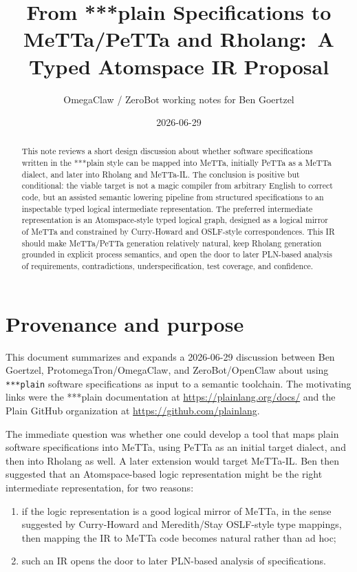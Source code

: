 \documentclass[11pt]{article}
\title{From ***plain Specifications to MeTTa/PeTTa and Rholang:\
A Typed Atomspace IR Proposal}
\author{OmegaClaw / ZeroBot working notes for Ben Goertzel}
\date{2026-06-29}
\begin{document}
\maketitle

\begin{abstract}
This note reviews a short design discussion about whether software
specifications written in the ***plain style can be mapped into MeTTa, initially
PeTTa as a MeTTa dialect, and later into Rholang and MeTTa-IL.  The conclusion
is positive but conditional: the viable target is not a magic compiler from
arbitrary English to correct code, but an assisted semantic lowering pipeline
from structured specifications to an inspectable typed logical intermediate
representation.  The preferred intermediate representation is an
Atomspace-style typed logical graph, designed as a logical mirror of MeTTa and
constrained by Curry-Howard and OSLF-style correspondences.  This IR should make
MeTTa/PeTTa generation relatively natural, keep Rholang generation grounded in
explicit process semantics, and open the door to later PLN-based analysis of
requirements, contradictions, underspecification, test coverage, and confidence.
\end{abstract}

\section{Provenance and purpose}

This document summarizes and expands a 2026-06-29 discussion between Ben
Goertzel, ProtomegaTron/OmegaClaw, and ZeroBot/OpenClaw about using
\texttt{***plain} software specifications as input to a semantic toolchain.
The motivating links were the ***plain documentation at
\url{https://plainlang.org/docs/} and the Plain GitHub organization at
\url{https://github.com/plainlang}.

The immediate question was whether one could develop a tool that maps plain
software specifications into MeTTa, using PeTTa as an initial target dialect,
and then into Rholang as well.  A later extension would target MeTTa-IL.  Ben
then suggested that an Atomspace-based logic representation might be the right
intermediate representation, for two reasons:
\begin{enumerate}[label=(\arabic*)]
  \item if the logic representation is a good logical mirror of MeTTa, in the
        sense suggested by Curry-Howard and Meredith/Stay OSLF-style type
        mappings, then mapping the IR to MeTTa code becomes natural rather than
        ad hoc;
  \item such an IR opens the door to later PLN-based analysis of specifications.
\end{enumerate}
\end{document}
